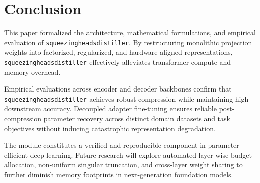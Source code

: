 \section{Conclusion}
This paper formalized the architecture, mathematical formulations, and empirical evaluation of \texttt{squeezingheadsdistiller}. By restructuring monolithic projection weights into factorized, regularized, and hardware-aligned representations, \texttt{squeezingheadsdistiller} effectively alleviates transformer compute and memory overhead.

Empirical evaluations across encoder and decoder backbones confirm that \texttt{squeezingheadsdistiller} achieves robust compression while maintaining high downstream accuracy. Decoupled adapter fine-tuning ensures reliable post-compression parameter recovery across distinct domain datasets and task objectives without inducing catastrophic representation degradation.

The module constitutes a verified and reproducible component in parameter-efficient deep learning. Future research will explore automated layer-wise budget allocation, non-uniform singular truncation, and cross-layer weight sharing to further diminish memory footprints in next-generation foundation models.
